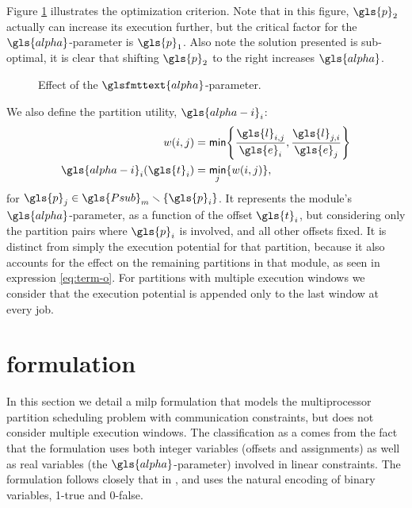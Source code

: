 \documentclass[main.tex]{subfiles}
\begin{document}
Figure \ref{fig:alpha} illustrates the optimization criterion. 
Note that in this figure, $\gls{p}_2$ actually can increase its execution further, but the critical factor for the $\gls{alpha}$-parameter is $\gls{p}_1$.
Also note the solution presented is sub-optimal, it is clear that shifting $\gls{p}_2$ to the right increases $\gls{alpha}$. 

\begin{figure}[htbp]
    \centering
    \resizebox{\linewidth}{!}{}
    \caption{Effect of the $\glsfmttext{alpha}$-parameter.}
    \label{fig:alpha}
\end{figure}

We also define the partition utility, $\gls{alpha-i}_i$:
\begin{align}
    w(i,j) &= \min\braces*{\frac{\gls{l}_{i,j}}{\gls{e}_i}, \frac{\gls{l}_{j,i}}{\gls{e}_j}} \label{eq:term-o} \\
    \gls{alpha-i}_i(\gls{t}_i) &= \min_j\braces*{w(i,j)}, \label{eq:partition-utility}
\end{align}
for ${\gls{p}_j\in\gls{Psub}_m\smallsetminus\braces{\gls{p}_i}}$.
It represents the module's $\gls{alpha}$-parameter, as a function of the offset $\gls{t}_i$, but considering only the partition pairs where $\gls{p}_i$ is involved, and all other offsets fixed.
It is distinct from simply the execution potential for that partition, because it also accounts for the effect on the remaining partitions in that module, as seen in expression \ref{eq:term-o}.
For partitions with multiple execution windows we consider that the execution potential is appended only to the last window at every job.

\section{ formulation}
\label{sec:milp}

In this section we detail a \gls{milp} formulation that models the multiprocessor partition scheduling problem with communication constraints, but does not consider multiple execution windows.
The classification as a  comes from the fact that the formulation uses both integer variables (offsets and assignments) as well as real variables (the $\gls{alpha}$-parameter) involved in linear constraints.
The formulation follows closely that in \cite{al2010partition}, and uses the natural encoding of binary variables, 1-true and 0-false.
\end{document}
